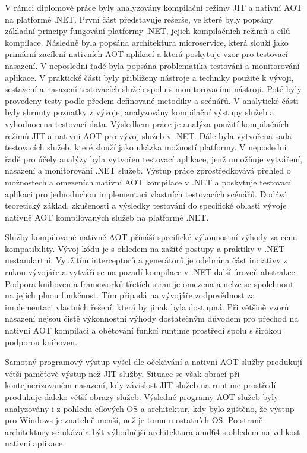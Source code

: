 
V rámci diplomové práce byly analyzovány kompilační režimy JIT a nativní AOT na platformě .NET. První část představuje rešerše, ve které byly popsány základní principy fungování platformy .NET, jejich kompilačních režimů a cílů kompilace. Následně byla popsána architektura microservice, která slouží jako primární zacílení nativních AOT aplikací a která poskytuje vzor pro testovací nasazení. V neposlední řadě byla popsána problematika testování a monitorování aplikace. V praktické části byly přiblíženy nástroje a techniky použité k vývoji, sestavení a nasazení testovacích služeb spolu s monitorovacími nástroji. Poté byly provedeny testy podle předem definované metodiky a scénářů. V analytické části byly shrnuty poznatky z vývoje, analyzovány kompilační výstupy služeb a vyhodnocena testovací data. Výsledkem práce je analýza použití kompilačních režimů JIT a nativní AOT pro vývoj služeb v .NET. Dále byla vytvořena sada testovacích služeb, které slouží jako ukázka možností platformy. V neposlední řadě pro účely analýzy byla vytvořen testovací aplikace, jenž umožňuje vytváření, nasazení a monitorování .NET služeb. Výstup práce zprostředkovává přehled o možnostech a omezeních nativní AOT kompilace v .NET a poskytuje testovací aplikaci pro jednoduchou implementaci vlastních testovacích scénářů. Dodává teoretický základ, zkušenosti a výsledky testování do specifické oblasti vývoje nativně AOT kompilovaných služeb na platformě .NET.

Služby kompilované nativně AOT přináší specifické výkonnostní výhody za cenu kompatibility. Vývoj kódu je s ohledem na zažité postupy a praktiky v .NET nestandartní. Využitím interceptorů a generátorů je odebrána část inciativy z rukou vývojáře a vytváří se na pozadí kompilace v .NET další úroveň abstrakce. Podpora knihoven a frameworků třetích stran je omezena a nelze se spolehnout na jejich plnou funkčnost. Tím připadá na vývojáře zodpovědnost za implementaci vlastních řešení, která by jinak byla dostupná. Při většině vzorů nasazení nejsou čistě výkonnostní výhody dostatečným důvodem pro přechod na nativní AOT kompilaci a obětování funkcí runtime prostředí spolu s širokou podporou knihoven.

Samotný programový výstup vyšel dle očekávání a nativní AOT služby produkují větší paměťově výstup než JIT služby. Situace se však obrací při kontejnerizovaném nasazení, kdy závislost JIT služeb na runtime prostředí produkuje daleko větší obrazy služeb. Výsledné programy AOT služeb byly analyzovány i z pohledu cílových OS a architektur, kdy bylo zjištěno, že výstup pro Windows je znatelně menší, než je tomu u ostatních OS. Po straně architektury se ukázala být výhodnější architektura amd64 s ohledem na velikost nativní aplikace.

